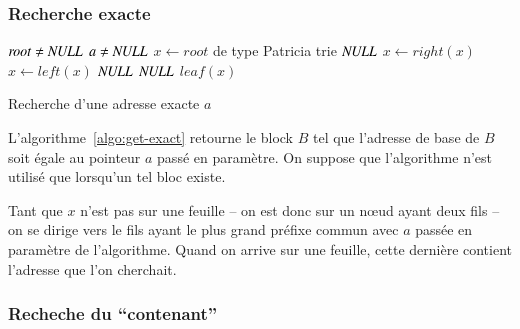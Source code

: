 \subsubsection*{Recherche exacte}

\begin{algorithm}
\begin{algorithmic}
\Require $\mathit{root} \neq \mathit{NULL}$
\Require $a \neq \mathit{NULL}$
\State $x \gets \mathit{root}$ de type Patricia trie
    \Return $\mathit{NULL}$
  \EndIf
    \State $x \gets \mathit{right(x)}$
    \State $x \gets \mathit{left(x)}$
  \Else
    \Return $\mathit{NULL}$
  \EndIf
\EndWhile
{}
  \Return $\mathit{NULL}$
\Else
  \Return $\mathit{leaf(x)}$
\EndIf
\end{algorithmic}
\caption{Recherche d'une adresse exacte $a$
  \label{algo:get-exact}}
\end{algorithm}

L'algorithme~\ref{algo:get-exact} retourne le block $B$ tel que l'adresse de
base de $B$ soit égale au pointeur $a$ passé en paramètre.
On suppose que l'algorithme n'est utilisé que lorsqu'un tel bloc existe.

Tant que $x$ n'est pas sur une feuille -- on est donc sur un
n\oe{}ud ayant deux fils -- on se dirige vers le fils ayant le plus grand
préfixe commun avec $a$ passée en paramètre de l'algorithme.
Quand on arrive sur une feuille, cette dernière contient l'adresse que l'on
cherchait.

\subsubsection*{Recheche du ``contenant''}

